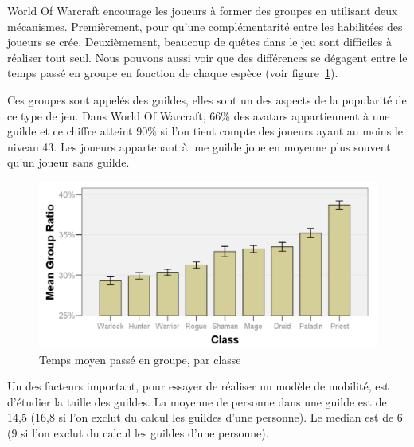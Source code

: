 \par World Of Warcraft encourage les joueurs à former des groupes en utilisant deux mécanismes. Premièrement, pour qu'une complémentarité entre les habilitées des joueurs se crée. Deuxièmement, beaucoup de quêtes dans le jeu sont difficiles à réaliser tout seul. Nous pouvons aussi voir que des différences se dégagent entre le temps passé en groupe en fonction de chaque espèce (voir figure~\ref{tabltimegroup}).
\par Ces groupes sont appelés des guildes, elles sont un des aspects de la popularité de ce type de jeu. Dans World Of Warcraft, 66\% des avatars appartiennent à une guilde et ce chiffre atteint 90\% si l'on tient compte des joueurs ayant au moins le niveau 43. Les joueurs appartenant à une guilde joue en moyenne plus souvent qu'un joueur sans guilde. 
	\begin{figure}[!h]
        \centering
        \includegraphics[scale=0.95]{./Ressources/Images/tabltimegroup.png}
        \caption{Temps moyen passé en groupe, par classe}
        \label{tabltimegroup}
        \end{figure}
\par Un des facteurs important, pour essayer de réaliser un modèle de mobilité, est d'étudier la taille des guildes. La moyenne de personne dans une guilde est de 14,5 (16,8 si l'on exclut du calcul les guildes d'une personne). Le median est de 6 (9 si l'on exclut du calcul les guildes d'une personne). 

